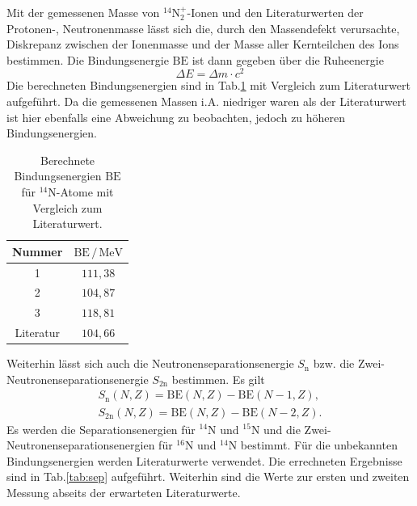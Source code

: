 \documentclass[numbers=noenddot,a4paper,notitlepage,twoside,BCOR15mm]{scrartcl}
\begin{document}
	Mit der gemessenen Masse von $^{14}$N$^+_2$-Ionen und den Literaturwerten der Protonen-, Neutronenmasse lässt sich die, durch den Massendefekt verursachte, Diskrepanz zwischen der Ionenmasse und der Masse aller Kernteilchen des Ions bestimmen. Die Bindungsenergie $\mathrm{BE}$ ist dann gegeben über die Ruheenergie
	\begin{equation}
	\Delta E = \Delta m\cdot c^2
	\end{equation}
	Die berechneten Bindungsenergien sind in Tab.\ref{tab:bind} mit Vergleich zum Literaturwert aufgeführt. Da die gemessenen Massen i.A. niedriger waren als der Literaturwert ist hier ebenfalls eine Abweichung zu beobachten, jedoch zu höheren Bindungsenergien.
	\begin{table}[h]
		\centering
		\caption{Berechnete Bindungsenergien $\mathrm{BE}$ für $^{14}$N-Atome mit Vergleich zum Literaturwert.}
		\begin{tabular}{c|c} 
			
			Nummer & $\mathrm{BE}\,/\,\mathrm{MeV}$ \\ \hline
			1 & $111,38$ \\
			2 & $104,87$ \\
			3 & $118,81$ \\
			Literatur & $104,66$
		\end{tabular}
		\label{tab:bind}
	\end{table}
	Weiterhin lässt sich auch die Neutronenseparationsenergie $S_\mathrm{n}$ bzw. die Zwei-Neutronenseparationsenergie $S_\mathrm{2n}$ bestimmen. Es gilt
	\begin{align}
	S_\mathrm{n}(N,Z) = \mathrm{BE}(N,Z) - \mathrm{BE}(N-1,Z), \nonumber \\
	S_\mathrm{2n}(N,Z) = \mathrm{BE}(N,Z) - \mathrm{BE}(N-2,Z).
	\end{align}
	Es werden die Separationsenergien für $^{14}$N und $^{15}$N und die Zwei-Neutronenseparationsenergien für $^{16}$N und $^{14}$N bestimmt. Für die unbekannten Bindungsenergien werden Literaturwerte verwendet. Die errechneten Ergebnisse sind in Tab.\ref{tab:sep} aufgeführt. Weiterhin sind die Werte zur ersten und zweiten Messung abseits der erwarteten Literaturwerte.
\end{document}
